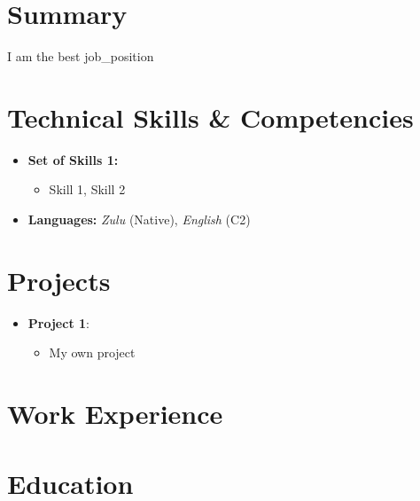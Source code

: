 \documentclass[11pt,a4paper,sans]{moderncv}
\newcommand{\rolename}{job_position}   %
\newcommand{\skills}{Skill 1, Skill 2} %
\begin{document}
\makecvtitle

\vspace{-0.0cm}

\section{Summary}
\begin{tcolorbox}[arc=0.5mm, colback=color3!10!white, colframe=color3!70!]
      I am the best \rolename
\end{tcolorbox}

\section{Technical Skills \& Competencies}
\begin{itemize}
\item \textbf{Set of Skills 1:} 
      \begin{itemize}
            \item \skills
      \end{itemize}

\item \textbf{Languages:} \textit{Zulu} (Native), \textit{English} (C2)
\end{itemize}

\vspace{0.2cm}

\section{Projects}
\begin{itemize}
\item \textcolor{color3}{\textbf{Project 1}:}
\begin{itemize}
      \item My own project
\end{itemize}
\end{itemize}

\vspace{0.2cm}
\section{Work Experience}
\vspace{0.2cm}
\section{Education}
\end{document}

